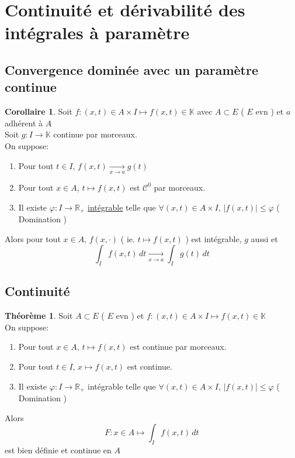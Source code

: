 \documentclass[10pt,a4paper]{article}
\theoremstyle{definition}
\newtheorem{theorem}[proposition]{Théorème}
\newtheorem{corollary}[proposition]{Corollaire}
\begin{document}
\section{Continuité et dérivabilité des intégrales à paramètre}
\subsection{Convergence dominée avec un paramètre continue}
\begin{corollary}
    Soit \(f:(x, t) \in A \times I \mapsto f(x, t) \in \mathbb{K}\) avec \(A \subset E\) ( \(E\) evn ) et \(a\) adhérent à \(A\) \\
    Soit \(g: I \to \mathbb{K}\) continue par morceaux. \\
    On suppose:
    \begin{enumerate}
        \item Pour tout \(t \in I\), \(f(x, t) \xrightarrow[x \to a]{}g(t)\)
        \item Pour tout \(x \in A\), \(t \mapsto f(x, t)\) est \(\mathcal{C}^0\) par morceaux.
        \item Il existe \(\varphi: I \to \mathbb{R}_+\) \uline{intégrable} telle que \(\forall (x, t) \in A \times I\), \(|f(x, t)| \leq \varphi\) ( Domination )
    \end{enumerate}
    Alors pour tout \(x \in A\), \(f(x, \cdot)\) ( ie. \(t \mapsto f(x, t)\) ) est intégrable, \(g\) aussi et
    \[\boxed{\int_{I} f(x, t) \,dt \xrightarrow[x \to a]{} \int_{I} g(t) \,dt}\]
\end{corollary}

\subsection{Continuité}
\begin{theorem}
    Soit \(A \subset E\) ( \(E\) evn ) et \(f: (x, t) \in A \times I \mapsto f(x, t) \in \mathbb{K}\) \\
    On suppose:
    \begin{enumerate}
        \item Pour tout \(x \in A\), \(t \mapsto f(x, t)\) est continue par morceaux.
        \item Pour tout \(t \in I\), \(x \mapsto f(x, t)\) est continue.
        \item Il existe \(\varphi: I \to \mathbb{R}_+\) intégrable telle que \(\forall (x, t) \in A \times I\), \(|f(x, t)| \leq \varphi\) ( Domination )
    \end{enumerate}
    Alors \[F: x \in A \mapsto \int_{I} f(x, t) \,dt\] est bien définie et continue en \(A\)
\end{theorem}
\end{document}
